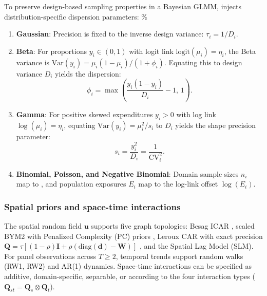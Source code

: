 To preserve design-based sampling properties in a Bayesian GLMM,  injects distribution-specific dispersion parameters:
\%

\begin{enumerate}
  \item \textbf{Gaussian}: Precision is fixed to the inverse design variance: $\tau_i = 1/D_i$.
  \item \textbf{Beta}: For proportions $y_i \in (0, 1)$ with logit link $\mathrm{logit}(\mu_i) = \eta_i$, the Beta variance is $\mathrm{Var}(y_i) = \mu_i(1 - \mu_i)/(1 + \phi_i)$. Equating this to design variance $D_i$ yields the \citet{janicki2020properties} dispersion:
  \begin{equation} \label{eq:beta_dispersion}
  \phi_i = \max\left( \frac{y_i (1 - y_i)}{D_i} - 1, \, 1 \right).
  \end{equation}
  \item \textbf{Gamma}: For positive skewed expenditures $y_i > 0$ with log link $\log(\mu_i) = \eta_i$, equating $\mathrm{Var}(y_i) = \mu_i^2 / s_i$ to $D_i$ yields the shape precision parameter:
  \begin{equation}
  s_i = \frac{y_i^2}{D_i} = \frac{1}{\mathrm{CV}_i^2}.
  \end{equation}
  \item \textbf{Binomial, Poisson, and Negative Binomial}: Domain sample sizes $n_i$ map to , and population exposures $E_i$ map to the log-link offset $\log(E_i)$.
\end{enumerate}

\subsubsection{Spatial priors and space-time interactions}

The spatial random field \(\bm{u}\) supports five graph topologies: Besag ICAR \citep{besag1991bayesian}, scaled BYM2 with Penalized Complexity (PC) priors \citep{riebler2016intuitive, simpson2017penalising}, Leroux CAR with exact precision \(\bm{Q} = \tau[(1 - \rho)\bm{I} + \rho(\mathrm{diag}(\bm{d}) - \bm{W})]\) \citep{leroux2000estimation}, and the Spatial Lag Model (SLM). For panel observations across \(T \ge 2\), temporal trends support random walks (RW1, RW2) and AR(1) dynamics. Space-time interactions can be specified as additive, domain-specific, separable, or according to the four \citet{knorrheld2000bayesian} interaction types (\(\bm{Q}_{st} = \bm{Q}_s \otimes \bm{Q}_t\)).

